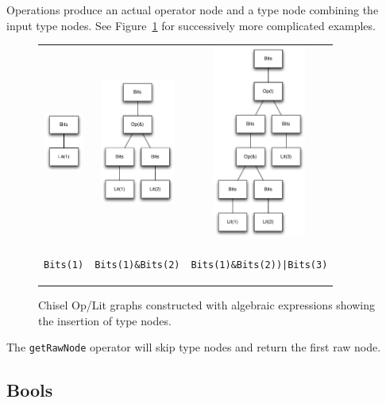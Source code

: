 \documentclass[10pt,twocolumn]{article}
\newcommand{\kode}[1]{\begin{footnotesize}{\tt #1}\end{footnotesize}}
\def\code#1{{\small\tt #1}}
\begin{document}
Operations produce an actual operator node and a type node combining the input type nodes.
See Figure~\ref{fig:bits-expressions} for
successively more complicated examples.

\begin{figure}
\begin{center}
\begin{tabular}{ccc}
\includegraphics[height=0.78in]{figs/bits-1.pdf} &
\includegraphics[height=1.63in]{figs/bits-and.pdf} &
\includegraphics[height=2.5in]{figs/bits-or-and.pdf} \\
\kode{Bits(1)} & \kode{Bits(1)\&Bits(2)} &
\kode{Bits(1)\&Bits(2))|Bits(3)} \\
\end{tabular}
\end{center}
\caption{Chisel Op/Lit graphs constructed with algebraic expressions
  showing the insertion of type nodes.}
\label{fig:bits-expressions}
\end{figure}

\noindent
The \code{getRawNode} operator will skip type nodes and return the first
raw node.

\subsection{Bools}
\end{document}

